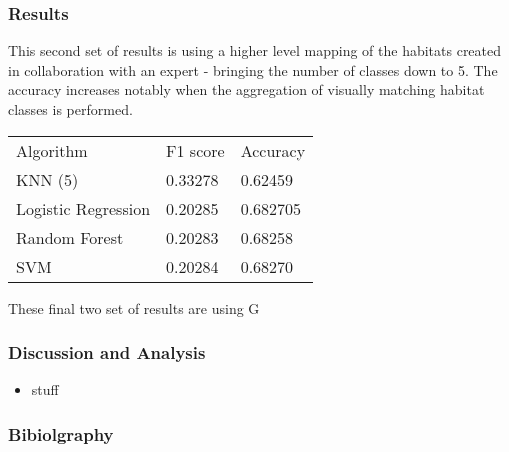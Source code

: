 \documentclass{beamer}
\begin{document}
\begin{frame}
    \frametitle{Results}
    This second set of results is using a higher level mapping of the habitats created in collaboration with an expert - bringing the number of classes down to 5. The accuracy increases notably when the aggregation of visually matching habitat classes is performed.

    \begin{tabular}{l | l | l}
        Algorithm & F1 score & Accuracy \\
        KNN (5) & 0.33278 & 0.62459 \\
        Logistic Regression & 0.20285 & 0.682705 \\
        Random Forest & 0.20283 & 0.68258 \\
        SVM & 0.20284 & 0.68270 \\
    \end{tabular}

\end{frame}

\begin{frame}
    These final two set of results are using G
\end{frame}


\begin{frame}
    \frametitle{Discussion and Analysis}
    \begin{itemize}
        \item stuff
    \end{itemize}
\end{frame}

\begin{frame}
    \frametitle{Bibiolgraphy}
    
    
\end{frame}

\end{document}
